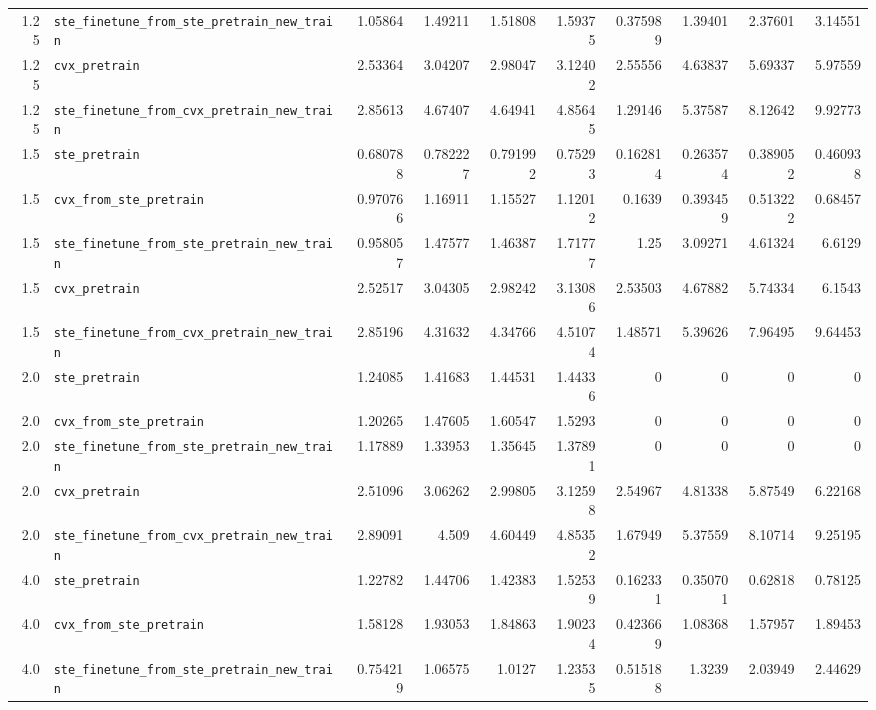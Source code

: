 \begin{longtable}{@{}r l *{8}{r}@{}}
1.25 & \texttt{ste\_finetune\_from\_ste\_pretrain\_new\_train} & 1.05864 & 1.49211 & 1.51808 & 1.59375 & 0.375989 & 1.39401 & 2.37601 & 3.14551 \\
1.25 & \texttt{cvx\_pretrain} & 2.53364 & 3.04207 & 2.98047 & 3.12402 & 2.55556 & 4.63837 & 5.69337 & 5.97559 \\
1.25 & \texttt{ste\_finetune\_from\_cvx\_pretrain\_new\_train} & 2.85613 & 4.67407 & 4.64941 & 4.85645 & 1.29146 & 5.37587 & 8.12642 & 9.92773 \\
1.5 & \texttt{ste\_pretrain} & 0.680788 & 0.782227 & 0.791992 & 0.75293 & 0.162814 & 0.263574 & 0.389052 & 0.460938 \\
1.5 & \texttt{cvx\_from\_ste\_pretrain} & 0.970766 & 1.16911 & 1.15527 & 1.12012 & 0.1639 & 0.393459 & 0.513222 & 0.68457 \\
1.5 & \texttt{ste\_finetune\_from\_ste\_pretrain\_new\_train} & 0.958057 & 1.47577 & 1.46387 & 1.71777 & 1.25 & 3.09271 & 4.61324 & 6.6129 \\
1.5 & \texttt{cvx\_pretrain} & 2.52517 & 3.04305 & 2.98242 & 3.13086 & 2.53503 & 4.67882 & 5.74334 & 6.1543 \\
1.5 & \texttt{ste\_finetune\_from\_cvx\_pretrain\_new\_train} & 2.85196 & 4.31632 & 4.34766 & 4.51074 & 1.48571 & 5.39626 & 7.96495 & 9.64453 \\
2.0 & \texttt{ste\_pretrain} & 1.24085 & 1.41683 & 1.44531 & 1.44336 & 0 & 0 & 0 & 0 \\
2.0 & \texttt{cvx\_from\_ste\_pretrain} & 1.20265 & 1.47605 & 1.60547 & 1.5293 & 0 & 0 & 0 & 0 \\
2.0 & \texttt{ste\_finetune\_from\_ste\_pretrain\_new\_train} & 1.17889 & 1.33953 & 1.35645 & 1.37891 & 0 & 0 & 0 & 0 \\
2.0 & \texttt{cvx\_pretrain} & 2.51096 & 3.06262 & 2.99805 & 3.12598 & 2.54967 & 4.81338 & 5.87549 & 6.22168 \\
2.0 & \texttt{ste\_finetune\_from\_cvx\_pretrain\_new\_train} & 2.89091 & 4.509 & 4.60449 & 4.85352 & 1.67949 & 5.37559 & 8.10714 & 9.25195 \\
4.0 & \texttt{ste\_pretrain} & 1.22782 & 1.44706 & 1.42383 & 1.52539 & 0.162331 & 0.350701 & 0.62818 & 0.78125 \\
4.0 & \texttt{cvx\_from\_ste\_pretrain} & 1.58128 & 1.93053 & 1.84863 & 1.90234 & 0.423669 & 1.08368 & 1.57957 & 1.89453 \\
4.0 & \texttt{ste\_finetune\_from\_ste\_pretrain\_new\_train} & 0.754219 & 1.06575 & 1.0127 & 1.23535 & 0.515188 & 1.3239 & 2.03949 & 2.44629 \\

\end{longtable}
